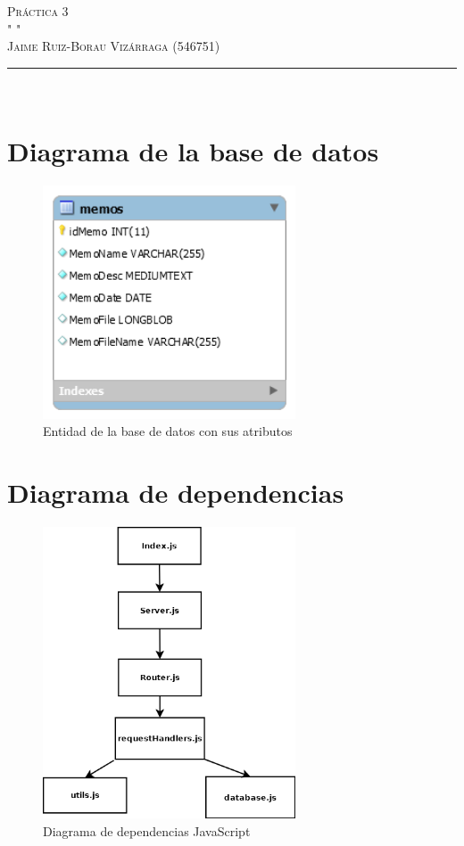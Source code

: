 \documentclass[a4paper]{article}
\newcommand{\HRule}{\rule{\linewidth}{0.35mm}} %
\begin{document}
\marginsize{3cm}{3cm}{2.5cm}{2.5cm} 

\begin{flushright}
	\textsc{\huge Práctica 3\\}
	\textsc{\tiny " "\\}
	\textsc{\large
		Jaime Ruiz-Borau Vizárraga (546751)\\
	}
	\HRule \\
\end{flushright}

\section{Diagrama de la base de datos}
\setcounter{page}{1}
\begin{figure}[H]
	\centering
	\includegraphics[width=7.5cm,keepaspectratio]{diagramaer}
	\caption{Entidad de la base de datos con sus atributos}
	\label{fig:trayec1ej3}
\end{figure}
\section{Diagrama de dependencias}
\begin{figure}[H]
	\centering
	\includegraphics[width=7.5cm,keepaspectratio]{DiagramaJS}
	\caption{Diagrama de dependencias JavaScript}
	\label{fig:trayec1ej3}
\end{figure}
\end{document}
